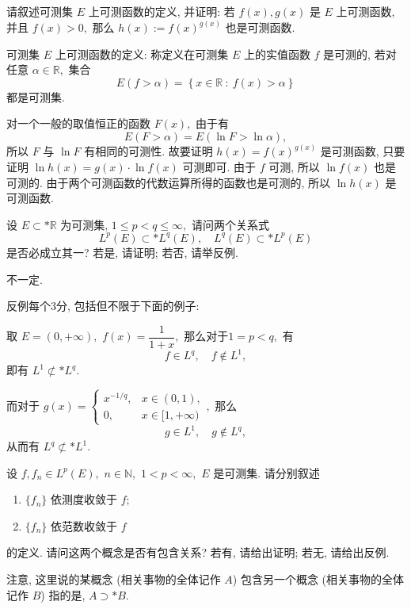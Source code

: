 \begin{question}[points = 10]
请叙述可测集 $E$ 上可测函数的定义, 并证明: 若 $f(x), g(x)$ 是 $E$ 上可测函数, 并且 $f(x) > 0,$ 那么 $h(x) := f(x)^{g(x)}$ 也是可测函数.

\end{question}

\begin{solution}
可测集 $E$ 上可测函数的定义: 称定义在可测集 $E$ 上的实值函数 $f$ 是可测的, 若对任意 $\alpha \in \mathbb{R},$ 集合
$$
E(f > \alpha) = \left\{ x \in \mathbb{R} ~ : ~ f(x) > \alpha \right\}
$$
都是可测集. 

对一个一般的取值恒正的函数 $F(x),$ 由于有
$$
E(F > \alpha) = E( \ln F > \ln \alpha),
$$
所以 $F$ 与 $\ln F$ 有相同的可测性. 故要证明 $h(x) = f(x)^{g(x)}$ 是可测函数, 只要证明 $\ln h(x) = g(x) \cdot \ln f(x)$ 可测即可. 
由于 $f$ 可测, 所以 $\ln f(x)$ 也是可测的. 由于两个可测函数的代数运算所得的函数也是可测的, 所以 $\ln h(x)$ 是可测函数. 
\end{solution}

\begin{question}[points = 10]
设 $E \subset* \mathbb{R}$ 为可测集, $1 \leqslant p < q \leqslant \infty,$ 请问两个关系式
$$
L^p(E) \subset* L^q(E), \quad L^q(E) \subset* L^p(E)
$$
是否必成立其一? 若是, 请证明; 若否, 请举反例.

\end{question}

\begin{solution}
不一定. 

反例每个3分, 包括但不限于下面的例子: 

取 $E = (0, +\infty),$ $\displaystyle f(x) = \dfrac{1}{1 + x},$ 那么对于$1 = p < q,$ 有
$$
f \in L^q, \quad f \not\in L^1,
$$
即有 $L^1 \not\subset* L^q.$

而对于 $\displaystyle g(x) = \begin{cases}
x^{-1/q}, & x \in (0, 1), \\
0, & x \in [1, +\infty)
\end{cases},$ 那么
$$
g \in L^1, \quad g \not\in L^q,
$$
从而有 $L^q \not\subset* L^1.$
\end{solution}

\begin{question}[points = 10]
设 $f, f_n \in L^p (E),$ $n \in \mathbb{N},$ $1 < p < \infty,$ $E$ 是可测集. 请分别叙述
\begin{enumerate}
\item $\{ f_n \}$ 依测度收敛于 $f;$
\item $\{ f_n \}$ 依范数收敛于 $f$
\end{enumerate}
的定义. 请问这两个概念是否有包含关系? 若有, 请给出证明; 若无, 请给出反例.

注意, 这里说的某概念 (相关事物的全体记作 $A$) 包含另一个概念 (相关事物的全体记作 $B$) 指的是, $A \supset* B.$

\end{question}


